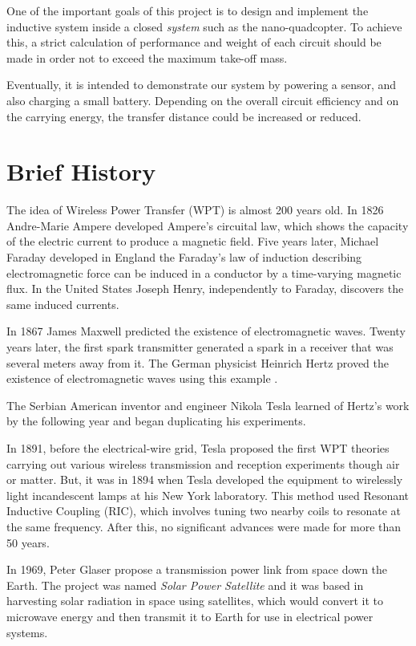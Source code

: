 One of the important goals of this project is to design and implement the inductive system inside a closed \textit{system} such as the nano-quadcopter. To achieve this, a strict calculation of performance and weight of each circuit should be made in order not to exceed the maximum take-off mass. 

Eventually, it is intended to demonstrate our system by powering a sensor, and also charging a small battery. Depending on the overall circuit efficiency and on the carrying energy, the transfer distance could be increased or reduced.  

\section{Brief History}\label{sec:timeline}

The idea of Wireless Power Transfer (WPT) is almost 200 years old. In 1826 Andre-Marie Ampere developed Ampere's circuital law, which shows the capacity of the electric current to produce a magnetic field. Five years later, Michael Faraday developed in England the Faraday's law of induction describing electromagnetic force can be induced in a conductor by a time-varying magnetic flux. In the United States Joseph Henry, independently to Faraday, discovers the same induced currents.\cite{keynote1}

In 1867 James Maxwell predicted the existence of electromagnetic waves. Twenty years later, the first spark transmitter generated a spark in a receiver that was several meters away from it. The German physicist Heinrich Hertz proved the existence of electromagnetic waves using this example \cite{2009wireless}.

The Serbian American inventor and engineer Nikola Tesla learned of Hertz's work by the following year and began duplicating his experiments.

In 1891, before the electrical-wire grid, Tesla proposed the first WPT theories \cite{meyer} carrying out various wireless transmission and reception experiments though air or matter. But, it was in 1894 when Tesla developed the equipment to wirelessly light incandescent lamps at his New York laboratory. This method used Resonant Inductive Coupling (RIC), which involves tuning two nearby coils to resonate at the same frequency. After this, no significant advances were made for more than 50 years. 

In 1969, Peter Glaser propose a transmission power link from space down the Earth. The project was named \textit{Solar Power Satellite} and it was based in harvesting solar radiation in space using satellites, which would convert it to microwave energy and then transmit it to Earth for use in electrical power systems.

